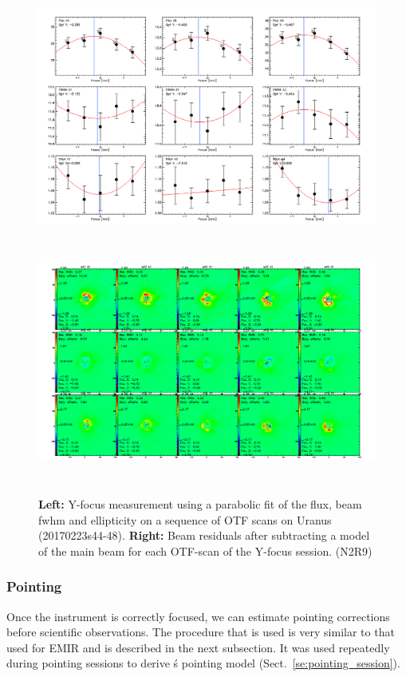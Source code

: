 \begin{figure}[h!]
\centering
\includegraphics[height=8cm]{Figures/plot_20170223s44.png}
\hspace{0.5cm}
\includegraphics[height=8cm]{Figures/residuals_focus_otf_20170223s44.png}
\caption[Lateral Y focus measures]{\textbf{Left:} Y-focus measurement using a
    parabolic fit of the flux, beam fwhm and ellipticity on a sequence
    of OTF scans on Uranus (20170223s44-48). \textbf{Right:} Beam residuals
    after subtracting a model of the main beam for each OTF-scan of the Y-focus
    session. (N2R9)}
\label{fig:Y_focus}
\end{figure}

\subsubsection{Pointing}
\label{se:pointing}

Once the instrument is correctly focused, we can estimate pointing corrections
before scientific observations. The procedure that is used is very similar to
that used for EMIR and is described in the next subsection. It was used
repeatedly during pointing sessions to derive \nika\'s pointing model
(Sect.~\ref{se:pointing_session}).

